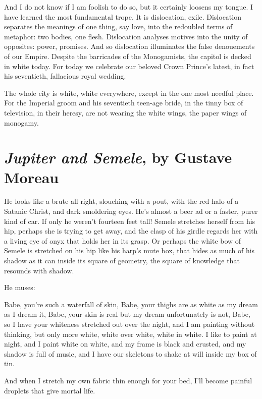 \documentclass[english,11pt,letterpaper,onecolumn]{scrbook}
\begin{document}
	And I do not know if I am foolish to do so, but it certainly loosens my tongue.  I have learned the most fundamental trope.  It is dislocation, exile.  Dislocation separates the meanings of one thing, say love, into the redoubled terms of metaphor:  two bodies, one flesh.  Dislocation analyses motives into the unity of opposites:  power, promises.  And so dislocation illuminates the false denouements of our Empire.  Despite the barricades of the Monogamists, the capitol is decked in white today.  For today we celebrate our beloved Crown Prince's latest, in fact his seventieth, fallacious royal wedding.

	The whole city is white, white everywhere, except in the one most needful place.  For the Imperial groom and his seventieth teen-age bride, in the tinny box of television, in their heresy, are not wearing the white wings, the paper wings of monogamy.


\newpage
\section{\emph{Jupiter and Semele}, by Gustave Moreau}

He looks like a brute all right, slouching with a pout, with the red halo of a Satanic Christ, and dark smoldering eyes.  He's almost a beer ad or a faster, purer kind of car.  If only he weren't fourteen feet tall!
Semele stretches herself from his hip, perhaps she is trying to get away, and the clasp of his girdle regards her with a living eye of onyx that holds her in its grasp.  Or perhaps the white bow of Semele is stretched on his hip like his harp's mute box, that hides as much of his shadow as it can inside its square of geometry, the square of knowledge that resounds with shadow.

He muses:

Babe, you're such a waterfall of skin, Babe, your thighs are as white as my dream as I dream it, Babe, your skin is real but my dream unfortunately is not, Babe, so I have your whiteness stretched out over the night, and I am painting without thinking, but only more white, white over white, white in white.  I like to paint at night, and I paint white on white, and my frame is black and crusted, and my shadow is full of music, and I have our skeletons to shake at will inside my box of tin.

And when I stretch my own fabric thin enough for your bed, I'll become painful droplets that give mortal life.
\end{document}
